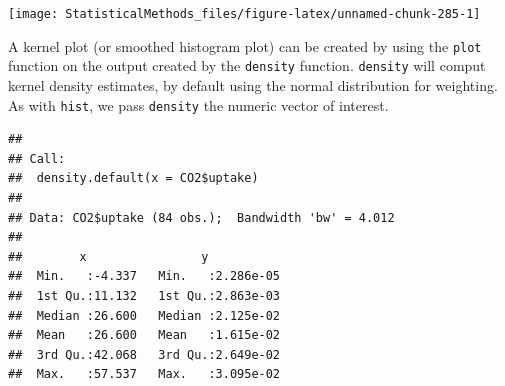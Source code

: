 \documentclass[
]{book}
\newenvironment{Shaded}{\begin{snugshade}}{\end{snugshade}}
\newcommand{\DataTypeTok}[1]{\textcolor[rgb]{0.13,0.29,0.53}{#1}}
\newcommand{\DecValTok}[1]{\textcolor[rgb]{0.00,0.00,0.81}{#1}}
\newcommand{\KeywordTok}[1]{\textcolor[rgb]{0.13,0.29,0.53}{\textbf{#1}}}
\newcommand{\NormalTok}[1]{#1}
\newcommand{\OperatorTok}[1]{\textcolor[rgb]{0.81,0.36,0.00}{\textbf{#1}}}
\newcommand{\StringTok}[1]{\textcolor[rgb]{0.31,0.60,0.02}{#1}}
\theoremstyle{definition}
\theoremstyle{definition}
\theoremstyle{definition}
\theoremstyle{remark}
\begin{document}
\begin{Shaded}
\end{Shaded}

\begin{center}\texttt{[image: StatisticalMethods\_files/figure-latex/unnamed-chunk-285-1]} \end{center}

A kernel plot (or smoothed histogram plot) can be created by using the \texttt{plot} function on the output created by the \texttt{density} function. \texttt{density} will comput kernel density estimates, by default using the normal distribution for weighting. As with \texttt{hist}, we pass \texttt{density} the numeric vector of interest.

\begin{Shaded}
\end{Shaded}

\begin{verbatim}
## 
## Call:
##  density.default(x = CO2$uptake)
## 
## Data: CO2$uptake (84 obs.);  Bandwidth 'bw' = 4.012
## 
##        x                y            
##  Min.   :-4.337   Min.   :2.286e-05  
##  1st Qu.:11.132   1st Qu.:2.863e-03  
##  Median :26.600   Median :2.125e-02  
##  Mean   :26.600   Mean   :1.615e-02  
##  3rd Qu.:42.068   3rd Qu.:2.649e-02  
##  Max.   :57.537   Max.   :3.095e-02
\end{verbatim}

\begin{Shaded}
\end{Shaded}
\end{document}
